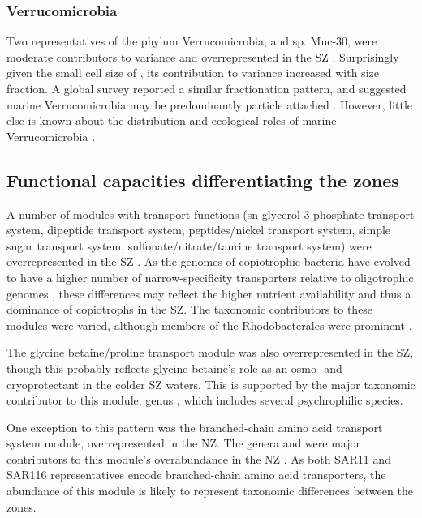\subsubsection{Verrucomicrobia}

Two representatives of the phylum Verrucomicrobia,  and  sp. Muc-30, were moderate contributors to variance and overrepresented in the \ac{SZ} .
Surprisingly given the small cell size of  \cite{Yoon:2007ic}, its contribution to variance increased with size fraction.
A global survey reported a similar fractionation pattern, and suggested marine Verrucomicrobia may be predominantly particle attached \cite{Freitas:2012jz}.
However, little else is known about the distribution and ecological roles of marine Verrucomicrobia \cite{Freitas:2012jz}.

\subsection{Functional capacities differentiating the zones}

A number of modules with transport functions (sn-glycerol 3-phosphate transport system, dipeptide transport system, peptides/nickel transport system, simple sugar transport system, sulfonate/nitrate/taurine transport system) were overrepresented in the \ac{SZ} .
As the genomes of copiotrophic bacteria have evolved to have a higher number of narrow-specificity transporters relative to oligotrophic genomes \cite{Lauro:2009gx}, these differences may reflect the higher nutrient availability and thus a dominance of copiotrophs in the \ac{SZ}.
The taxonomic contributors to these modules were varied, although members of the Rhodobacterales were prominent .



The glycine betaine/proline transport module was also overrepresented in the \ac{SZ}, though this probably reflects glycine betaine's role as an osmo- and cryoprotectant in the colder \ac{SZ} waters.
This is supported by the major taxonomic contributor to this module, genus , which includes several psychrophilic species. 

One exception to this pattern was the branched-chain amino acid transport system module, overrepresented in the \ac{NZ}. 
The genera  and  were major contributors to this module's overabundance in the \ac{NZ} .
As both SAR11 \cite{Giovannoni:2005ib} and SAR116 \cite{Grote:2011dm} representatives encode branched-chain amino acid transporters, the abundance of this module is likely to represent taxonomic differences between the zones.

